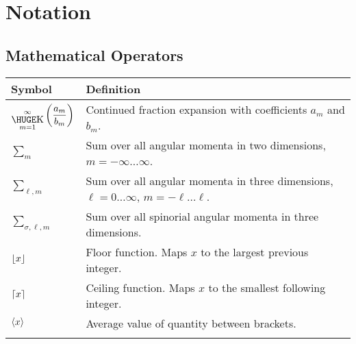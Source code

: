 \chapter*{Notation}


\section*{Mathematical Operators}
\begin{tabularx}{\textwidth}{lX}
  \hline\hline
  Symbol			& Definition	\\
  \hline\hline				
  $\displaystyle{\bigk_{m=1}^\infty\left(\frac{a_m}{b_m}\right)}$
				& Continued fraction expansion with coefficients $a_m$ and $b_m$. \\
  ${\sum_m}$			& Sum over all angular momenta in two dimensions, $m=-\infty\ldots\infty$.\\
  ${\sum_{\ell,m}}$		& Sum over all angular momenta in three dimensions, $\ell=0\ldots\infty$, $m=-\ell\ldots\ell$. \\
  ${\sum_{\sigma,\ell,m}}$	& Sum over all spinorial angular momenta in three dimensions.	\\
  $\floor*{x}$			& Floor function. Maps $x$ to the largest previous integer.	\\
  $\ceil*{x}$			& Ceiling function. Maps $x$ to the smallest following integer.	\\
  $\avg{x}$			& Average value of quantity between brackets.			\\
  \hline\hline				\\
\end{tabularx}

